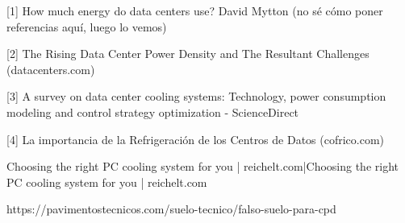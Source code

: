 [1] How much energy do data centers use? David Mytton (no sé cómo poner referencias aquí, luego lo vemos)

[2] The Rising Data Center Power Density and The Resultant Challenges (datacenters.com)

[3] A survey on data center cooling systems: Technology, power consumption modeling and control strategy optimization - ScienceDirect

[4] La importancia de la Refrigeración de los Centros de Datos (cofrico.com)

Choosing the right PC cooling system for you | reichelt.com|Choosing the right PC cooling system for you | reichelt.com

https://pavimentostecnicos.com/suelo-tecnico/falso-suelo-para-cpd
